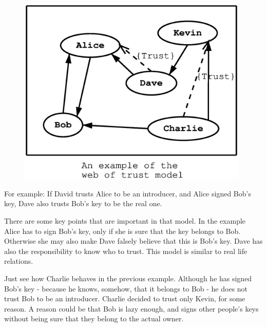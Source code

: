 \begin{figure}[hbtp]
\includegraphics[height=9cm,width=11cm]{pgp-fig1}
\label{fig:pgp1}
\end{figure}

For example: If David trusts Alice to be an introducer, and Alice signed
Bob's key, Dave also trusts Bob's key to be the real one.

There are some key points that are important in that model. In the example
Alice has to sign Bob's key, only if she is sure that the key belongs
to Bob. Otherwise she may also make Dave falsely believe that this
is Bob's key. Dave has also the responsibility to know who to trust.
This model is similar to real life relations.

Just see how Charlie behaves in the previous example. Although he has 
signed Bob's key - because he knows, somehow, that it belongs to Bob - 
he does not trust Bob to be an introducer. Charlie decided to trust only 
Kevin, for some reason. A reason could be that Bob is lazy enough, and 
signs other people's keys without being sure that they belong to the 
actual owner.

